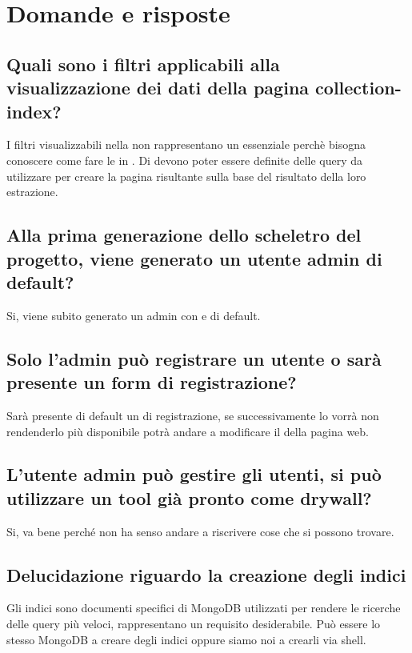 \newpage
\section{Domande e risposte}
\label{2}

\subsection{Quali sono i filtri applicabili alla visualizzazione dei dati della pagina collection-index?}
I filtri visualizzabili nella  non rappresentano un  essenziale perchè bisogna conoscere come fare le  in . Di  devono poter essere definite delle query da utilizzare per creare la pagina risultante sulla base del risultato della loro estrazione.

\subsection{Alla prima generazione dello scheletro del progetto, viene generato un utente admin di default?}
Si, viene subito generato un admin con  e  di default.

\subsection{Solo l'admin può registrare un utente o sarà presente un form di registrazione?}
Sarà presente di default un  di registrazione, se successivamente lo  vorrà non rendenderlo più disponibile potrà andare a modificare il  della pagina web.

\subsection{L'utente admin può gestire gli utenti, si può utilizzare un tool già pronto come drywall?}
Si, va bene perché non ha senso andare a riscrivere cose che si possono trovare.

\subsection{Delucidazione riguardo la creazione degli indici}
Gli indici sono documenti specifici di MongoDB utilizzati per rendere le ricerche delle query più veloci, rappresentano un requisito desiderabile. Può essere lo stesso MongoDB a creare degli indici oppure siamo noi a crearli via shell.

